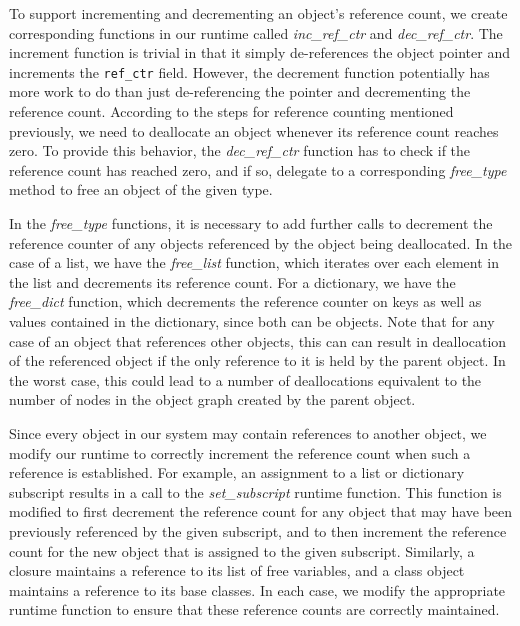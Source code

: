 \documentclass{sigplanconf}
\newcommand{\afunction}[1]{\textit{#1}}
\newcommand{\afield}[1]{\texttt{#1}}
\begin{document}
To support incrementing and decrementing an object's reference count, we create corresponding functions in our runtime called \afunction{inc\_ref\_ctr} and \afunction{dec\_ref\_ctr}.  The increment function is trivial in that it simply de-references the object pointer and increments the \afield{ref\_ctr} field.   However, the decrement function potentially has more work to do than just de-referencing the pointer and decrementing the reference count.  According to the steps for reference counting mentioned previously, we need to deallocate an object whenever its reference count reaches zero.  To provide this behavior, the \afunction{dec\_ref\_ctr} function has to check if the reference count has reached zero, and if so, delegate to a corresponding \afunction{free\_\textit{type}} method to free an object of the given type.

In the \afunction{free\_\textit{type}} functions, it is necessary to add further calls to decrement the reference counter of any objects referenced by the object being deallocated.  In the case of a list, we have the \afunction{free\_list} function, which iterates over each element in the list and decrements its reference count.  For a dictionary, we have the \afunction{free\_dict} function, which decrements the reference counter on keys as well as values contained in the dictionary, since both can be objects.  Note that for any case of an object that references other objects, this can can result in deallocation of the referenced object if the only reference to it is held by the parent object.  In the worst case, this could lead to a number of deallocations equivalent to the number of nodes in the object graph created by the parent object.  

Since every object in our system may contain references to another object, we modify our runtime to correctly increment the reference count when such a reference is established.  For example, an assignment to a list or dictionary subscript results in a call to the \afunction{set\_subscript} runtime function.  This function is modified to first decrement the reference count for any object that may have been previously referenced by the given subscript, and to then increment the reference count for the new object that is assigned to the given subscript.  Similarly, a closure maintains a reference to its list of free variables, and a class object maintains a reference to its base classes.  In each case, we modify the appropriate runtime function to ensure that these reference counts are correctly maintained.  
\end{document}
